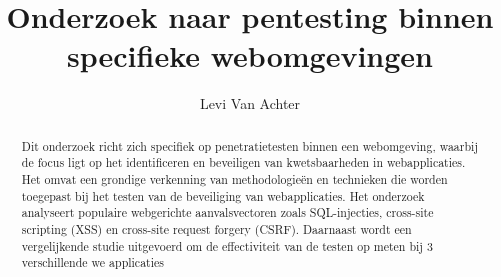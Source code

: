 \documentclass[a0,portrait]{hogent-poster}
\title{Onderzoek naar pentesting binnen specifieke webomgevingen}
\author{Levi Van Achter}
\begin{document}
\maketitle

\begin{abstract}
  Dit onderzoek richt zich specifiek op penetratietesten binnen een webomgeving, waarbij de focus ligt op het
  identificeren en beveiligen van kwetsbaarheden in webapplicaties. Het omvat een grondige verkenning van
  methodologieën en technieken die worden toegepast bij het testen van de beveiliging van webapplicaties. Het
  onderzoek analyseert populaire webgerichte aanvalsvectoren zoals SQL-injecties, cross-site scripting (XSS) en
  cross-site request forgery (CSRF). Daarnaast wordt een vergelijkende studie uitgevoerd om de effectiviteit van
  de testen op meten bij 3 verschillende we applicaties
\end{abstract}
\end{document}
